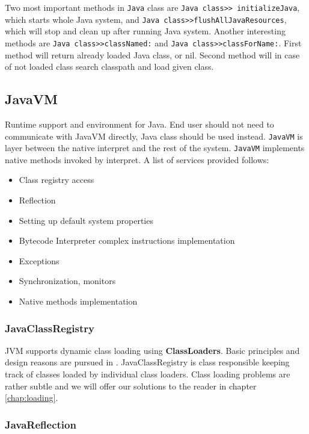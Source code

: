 \documentclass[11pt,twoside,a4paper]{book}
\begin{document}
Two most important methods in \texttt{Java} class are \texttt{Java class>>~initializeJava}, which starts whole Java system, and \texttt{Java class>>flushAllJavaResources}, which will stop and clean up after running Java system.
Another interesting methods are \texttt{Java class>>classNamed:} and \texttt{Java class>>classForName:}.
First method will return already loaded Java class, or nil.
Second method will in case of not loaded class search classpath and load given class.

\subsection{JavaVM}

Runtime support and environment for Java. 
End user should not need to communicate with JavaVM directly, Java class should be used instead. 
\texttt{JavaVM} is layer between the native interpret and the rest of the system. 
\texttt{JavaVM} implements native methods invoked by interpret.
A list of services provided follows:

\begin{itemize}
	\item Class registry access
	\item Reflection
	\item Setting up default system properties
	\item Bytecode Interpreter complex instructions implementation
	\item Exceptions
	\item Synchronization, monitors
	\item Native methods implementation
\end{itemize}

\subsubsection{JavaClassRegistry}

JVM supports dynamic class loading using \textbf{ClassLoaders}. 
Basic principles and design reasons are pursued in \cite{bracha98}. 
JavaClassRegistry is class responsible keeping track of classes loaded by individual class loaders.
Class loading problems are rather subtle and we will offer our solutions to the reader in chapter \ref{chap:loading}.

\subsubsection{JavaReflection}
\end{document}
